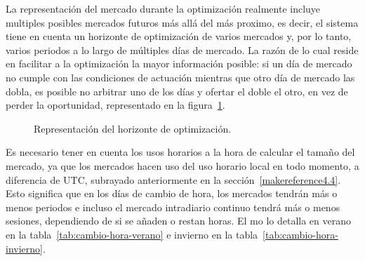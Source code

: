 La representación del mercado durante la optimización realmente incluye multiples posibles mercados futuros más allá del más proximo, es decir, el sistema tiene en cuenta un horizonte de optimización de varios mercados y, por lo tanto, varios periodos a lo largo de múltiples días de mercado. La razón de lo cual reside en facilitar a la optimización la mayor información posible: si un día de mercado no cumple con las condiciones de actuación mientras que otro día de mercado las dobla, es posible no arbitrar uno de los días y ofertar el doble el otro, en vez de perder la oportunidad, representado en la figura~\ref{fig:horizonte-de-optimizacióno}.

\begin{figure}
  \centering
  \caption[Representación del horizonte de optimización.]{Representación del horizonte de optimización.}
  \label{fig:horizonte-de-optimizacióno}
\end{figure}

Es necesario tener en cuenta los usos horarios a la hora de calcular el tamaño del mercado, ya que los mercados hacen uso del uso horario local en todo momento, a diferencia de UTC, subrayado anteriormente en la sección~\ref{makereference4.4}. Esto significa que en los días de cambio de hora, los mercados  tendrán más o menos periodos e incluso el mercado intradiario continuo tendrá más o menos sesiones, dependiendo de si se añaden o restan horas. El \gls{mo} lo detalla en verano en la tabla~\ref{tab:cambio-hora-verano} e invierno en la tabla~\ref{tab:cambio-hora-invierno}.

\begin{table}[ht]
  \centering
  \caption[Ajustes del mercado intradiario en cambios de hora de verano.]{Ajustes del mercado intradiario en cambios de hora de verano.}
  \label{tab:cambio-hora-verano}
\end{table}

